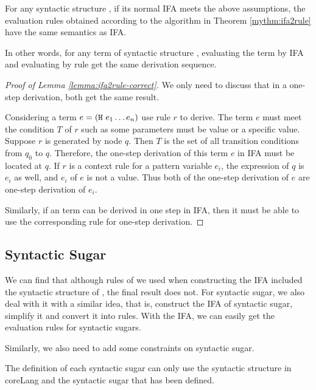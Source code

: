 \begin{lemma}
\label{lemma:ifa2rule-correct}
For any syntactic structure , if its normal IFA meets the above assumptions, the evaluation rules obtained according to the algorithm in Theorem \ref{mythm:ifa2rule} have the same semantics as IFA. 
\end{lemma}

In other words, for any term of syntactic structure , evaluating the term by IFA and evaluating by rule get the same derivation sequence.

\begin{proof}[Proof of Lemma \ref{lemma:ifa2rule-correct}]
We only need to discuss that in a one-step derivation, both get the same result.

Considering a term $e=(\mbox{\tt H}~e_1 \ldots e_n)$ use rule $r$ to derive. The term $e$ must meet the condition $T$ of $r$ such as some parameters must be value or a specific value. Suppose $r$ is generated by node $q$. Then $T$ is the set of all transition conditions from $q_0$ to $q$. Therefore, the one-step derivation of this term $e$ in IFA must be located at $q$. If $r$ is a context rule for a pattern variable $e_i$, the expression of $q$ is $e_i$ as well, and $e_i$ of $e$ is not a value. Thus both of the one-step derivation of $e$ are one-step derivation of $e_i$.

Similarly, if an term can be derived in one step in IFA, then it must be able to use the corresponding rule for one-step derivation.

\end{proof}

\subsection{Syntactic Sugar}

We can find that although rules of  we used when constructing the IFA included the syntactic structure of , the final result does not. For syntactic sugar, we also deal with it with a similar idea, that is, construct the IFA of syntactic sugar, simplify it and convert it into rules. With the IFA, we can easily get the evaluation rules for syntactic sugars.

Similarly, we also need to add some constraints on syntactic sugar.

\begin{Asm}
\label{Asm:orderliness-sugar}
The definition of each syntactic sugar can only use the syntactic structure in coreLang and the syntactic sugar that has been defined.
\end{Asm}

